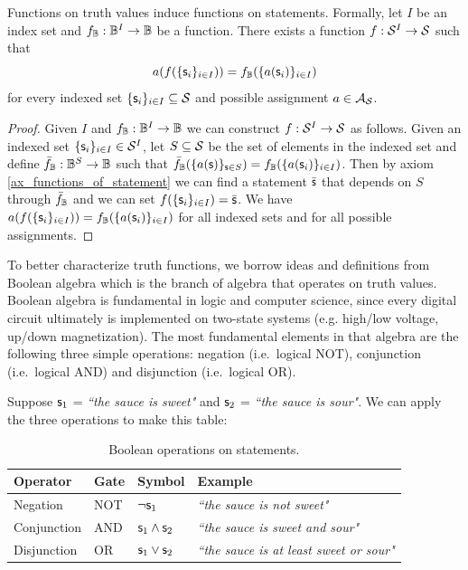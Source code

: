 \documentclass[11pt,letterpaper,fleqn]{memoir} %
\begin{document}
\begin{mathSection}
\begin{coro}
	Functions on truth values induce functions on statements. Formally, let $I$ be an index set and $f_{\mathbb{B}} : \mathbb{B}^I \to \mathbb{B}$ be a function. There exists a function $f : \mathcal{S}^I \to \mathcal{S}$ such that
	$$a(f(\{\mathsf{s}_i\}_{i \in I})) = f_{\mathbb{B}}(\{a(\mathsf{s}_i)\}_{i \in I})$$
	for every indexed set $\{\mathsf{s}_i\}_{i \in I} \subseteq \mathcal{S}$ and possible assignment $a \in \mathcal{A}_{\mathcal{S}}$.
\end{coro}
\begin{proof}
	Given $I$ and $f_{\mathbb{B}} : \mathbb{B}^I \to \mathbb{B}$ we can construct $f : \mathcal{S}^I \to \mathcal{S}$ as follows. Given an indexed set $\{\mathsf{s}_i\}_{i \in I} \in \mathcal{S}^I$, let $S \subseteq \mathcal{S}$ be the set of elements in the indexed set and define $\bar{f}_{\mathbb{B}} : \mathbb{B}^S \to \mathbb{B}$ such that $\bar{f}_{\mathbb{B}}(\{a(\mathsf{s})\}_{\mathsf{s} \in S}) = f_{\mathbb{B}}(\{a(\mathsf{s}_i)\}_{i \in I})$. Then by axiom \ref{ax_functions_of_statement} we can find a statement $\bar{\mathsf{s}}$ that depends on $S$ through $\bar{f}_{\mathbb{B}}$ and we can set $f(\{\mathsf{s}_i\}_{i \in I}) = \bar{\mathsf{s}}$. We have $a(f(\{\mathsf{s}_i\}_{i \in I})) = f_{\mathbb{B}}(\{a(\mathsf{s}_i)\}_{i \in I})$ for all indexed sets and for all possible assignments.
\end{proof}
\end{mathSection}

To better characterize truth functions, we borrow ideas and definitions from Boolean algebra which is the branch of algebra that operates on truth values. Boolean algebra is fundamental in logic and computer science, since every digital circuit ultimately is implemented on two-state systems (e.g. high/low voltage, up/down magnetization).  The most fundamental elements in that algebra are the following three simple operations: negation (i.e.~logical NOT), conjunction (i.e.~logical AND) and disjunction (i.e.~logical OR).

Suppose $\mathsf{s}_1$ = \emph{``the sauce is sweet"} and $\mathsf{s}_2$ = \emph{``the sauce is sour"}. We can apply the three operations to make this table:

\begin{table}[h]
	\centering
	\begin{tabular}{p{} p{} p{} p{}}
		Operator & Gate & Symbol & Example \\ 
		\hline 
		Negation & NOT & $\neg \mathsf{s}_1$ &  \emph{``the sauce is not sweet"} \\ 
		Conjunction & AND & $\mathsf{s}_1 \wedge \mathsf{s}_2$ & \emph{``the sauce is sweet and sour"} \\ 
		Disjunction & OR & $\mathsf{s}_1 \vee \mathsf{s}_2$ & \emph{``the sauce is at least sweet or sour"}
	\end{tabular} 
	\caption{Boolean operations on statements.}
\end{table}
\end{document}
